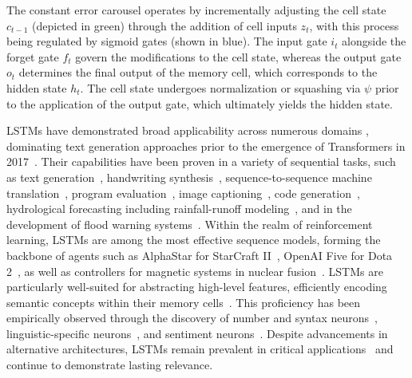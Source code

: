 The constant error carousel operates by incrementally adjusting the cell state $c_{t-1}$ (depicted in green) through the addition of cell inputs $z_t$, with this process being regulated by sigmoid gates (shown in blue). The input gate $i_t$ alongside the forget gate $f_t$ govern the modifications to the cell state, whereas the output gate $o_t$ determines the final output of the memory cell, which corresponds to the hidden state $h_t$. The cell state undergoes normalization or squashing via $\psi$ prior to the application of the output gate, which ultimately yields the hidden state.

LSTMs have demonstrated broad applicability across numerous domains \citep{Hochreiter:01,Hochreiter:07,Schmidhuber:15}, dominating text generation approaches prior to the emergence of Transformers in 2017~\citep{Vaswani:17}. Their capabilities have been proven in a variety of sequential tasks, such as text generation~\citep{Graves:13,Karpathy:15blog}, handwriting synthesis~\citep{Graves:13}, sequence-to-sequence machine translation~\citep{Sutskever:14nips}, program evaluation~\citep{Zaremba:14arxiv}, image captioning~\citep{Karpathy:15,Hossain:19}, code generation~\citep{Karpathy:15blog}, hydrological forecasting including rainfall-runoff modeling~\citep{Kratzert:18,Kratzert:19}, and in the development of flood warning systems~\citep{Nearing:24}. Within the realm of reinforcement learning, LSTMs are among the most effective sequence models, forming the backbone of agents such as AlphaStar for StarCraft II~\citep{Vinyals:17short}, OpenAI Five for Dota 2~\citep{OpenAI:19}, as well as controllers for magnetic systems in nuclear fusion~\citep{Degrave:22short}. LSTMs are particularly well-suited for abstracting high-level features, efficiently encoding semantic concepts within their memory cells~\citep{Karpathy:15blog}. This proficiency has been empirically observed through the discovery of number and syntax neurons~\citep{Lakretz:19}, linguistic-specific neurons~\citep{Bau:19}, and sentiment neurons~\citep{Radford:17arxiv}. Despite advancements in alternative architectures, LSTMs remain prevalent in critical applications~\citep{Degrave:22short,Nearing:24} and continue to demonstrate lasting relevance.

